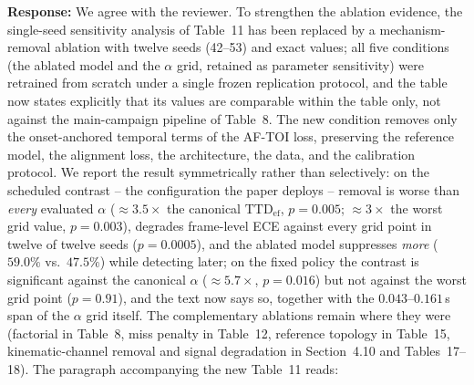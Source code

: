 \documentclass[1p,12pt,authoryear]{elsarticle}
\begin{document}
\vspace{2mm}
\noindent \textbf{Response:} We agree with the reviewer. To strengthen the ablation evidence, the single-seed sensitivity analysis of Table~11 has been replaced by a mechanism-removal ablation with twelve seeds (42--53) and exact values; all five conditions (the ablated model and the $\alpha$ grid, retained as parameter sensitivity) were retrained from scratch under a single frozen replication protocol, and the table now states explicitly that its values are comparable within the table only, not against the main-campaign pipeline of Table~8. The new condition removes only the onset-anchored temporal terms of the AF-TOI loss, preserving the reference model, the alignment loss, the architecture, the data, and the calibration protocol. We report the result symmetrically rather than selectively: on the scheduled contrast -- the configuration the paper deploys -- removal is worse than \emph{every} evaluated $\alpha$ (${\approx}3.5\times$ the canonical $\mathrm{TTD}_{\mathrm{ef}}$, $p=0.005$; ${\approx}3\times$ the worst grid value, $p=0.003$), degrades frame-level ECE against every grid point in twelve of twelve seeds ($p=0.0005$), and the ablated model suppresses \emph{more} ($59.0\%$ vs.\ $47.5\%$) while detecting later; on the fixed policy the contrast is significant against the canonical $\alpha$ (${\approx}5.7\times$, $p=0.016$) but not against the worst grid point ($p=0.91$), and the text now says so, together with the $0.043$--$0.161$\,s span of the $\alpha$ grid itself. The complementary ablations remain where they were (factorial in Table~8, miss penalty in Table~12, reference topology in Table~15, kinematic-channel removal and signal degradation in Section~4.10 and Tables~17--18). The paragraph accompanying the new Table~11 reads:

~
\end{document}
